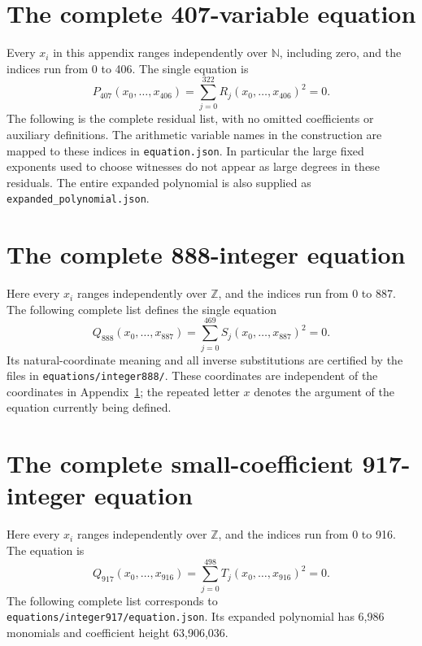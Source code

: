 \documentclass[10pt,letterpaper]{article}
\theoremstyle{definition}\newtheorem{definition}[theorem]{Definition}
\theoremstyle{remark}\newtheorem{remark}[theorem]{Remark}
\newcommand{\N}{\mathbb N}\newcommand{\Z}{\mathbb Z}\newcommand{\Q}{\mathbb Q}
\newcommand{\file}[1]{\texttt{\nolinkurl{#1}}}
\newcommand{\Pn}{P_{407}}\newcommand{\Pz}{Q_{888}}\newcommand{\Ps}{Q_{917}}
\begin{document}
\clearpage\appendix
\section{The complete 407-variable equation}\label{app:rows}

Every $x_i$ in this appendix ranges independently over $\N$, including
zero, and the indices run from 0 to 406. The single equation is
\begin{equation}\label{eq:literal}
 \boxed{\displaystyle \Pn(x_0,\ldots,x_{406})=
                  \sum_{j=0}^{322}R_j(x_0,\ldots,x_{406})^2=0.}
\end{equation}
The following is the complete residual list, with no omitted coefficients
or auxiliary definitions. The arithmetic variable names in the construction
are mapped to these indices in \file{equation.json}. In particular the
large fixed exponents used to choose witnesses do not appear as large
degrees in these residuals. The entire expanded polynomial is also
supplied as \file{expanded_polynomial.json}.



\clearpage
\section{The complete 888-integer equation}\label{app:integer888}

Here every $x_i$ ranges independently over $\Z$, and the indices run
from 0 to 887. The following complete list defines the single equation
\[
 \boxed{\displaystyle Q_{888}(x_0,\ldots,x_{887})
                  =\sum_{j=0}^{469}S_j(x_0,\ldots,x_{887})^2=0.}
\]
Its natural-coordinate meaning and all inverse substitutions are certified
by the files in \file{equations/integer888/}. These coordinates are
independent of the coordinates in Appendix~\ref{app:rows}; the repeated
letter $x$ denotes the argument of the equation currently being defined.



\clearpage
\section{The complete small-coefficient 917-integer equation}\label{app:integer917}

Here every $x_i$ ranges independently over $\Z$, and the indices run
from 0 to 916. The equation is
\[
 \boxed{\displaystyle Q_{917}(x_0,\ldots,x_{916})
                  =\sum_{j=0}^{498}T_j(x_0,\ldots,x_{916})^2=0.}
\]
The following complete list corresponds to
\file{equations/integer917/equation.json}. Its expanded polynomial has
6,986 monomials and coefficient height 63,906,036.


\end{document}
